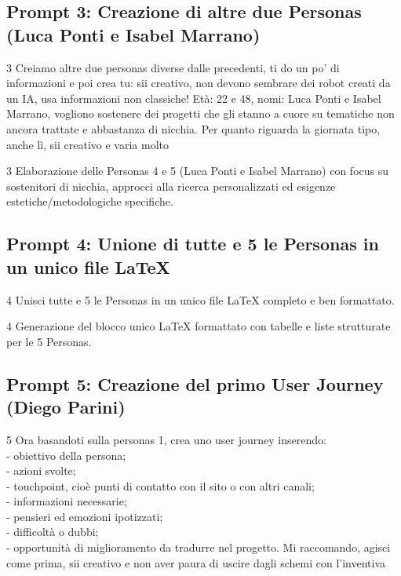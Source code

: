 \documentclass[11pt,a4paper]{article}
\begin{document}
    \subsection{Prompt 3: Creazione di altre due Personas (Luca Ponti e Isabel Marrano)}
    \label{prompt:3}
    \begin{promptbox}{3}
        Creiamo altre due personas diverse dalle precedenti, ti do un po' di informazioni e poi crea tu: sii creativo, non devono sembrare dei robot creati da un IA, usa informazioni non classiche! Età: 22 e 48, nomi: Luca Ponti e Isabel Marrano, vogliono sostenere dei progetti che gli stanno a cuore su tematiche non ancora trattate e abbastanza di nicchia. Per quanto riguarda la giornata tipo, anche lì, sii creativo e varia molto
    \end{promptbox}

    \begin{respbox}{3}
        Elaborazione delle Personas 4 e 5 (Luca Ponti e Isabel Marrano) con focus su sostenitori di nicchia, approcci alla ricerca personalizzati ed esigenze estetiche/metodologiche specifiche.
    \end{respbox}

    \subsection{Prompt 4: Unione di tutte e 5 le Personas in un unico file LaTeX}
    \label{prompt:4}
    \begin{promptbox}{4}
        Unisci tutte e 5 le Personas in un unico file LaTeX completo e ben formattato.
    \end{promptbox}

    \begin{respbox}{4}
        Generazione del blocco unico LaTeX formattato con tabelle e liste strutturate per le 5 Personas.
    \end{respbox}

    \subsection{Prompt 5: Creazione del primo User Journey (Diego Parini)}
    \label{prompt:5}
    \begin{promptbox}{5}
        Ora basandoti sulla personas 1, crea uno user journey inserendo:\\
        - obiettivo della persona;\\
        - azioni svolte;\\
        - touchpoint, cioè punti di contatto con il sito o con altri canali;\\
        - informazioni necessarie;\\
        - pensieri ed emozioni ipotizzati;\\
        - difficoltà o dubbi;\\
        - opportunità di miglioramento da tradurre nel progetto. Mi raccomando, agisci come prima, sii creativo e non aver paura di uscire dagli schemi con l'inventiva
    \end{promptbox}
\end{document}
